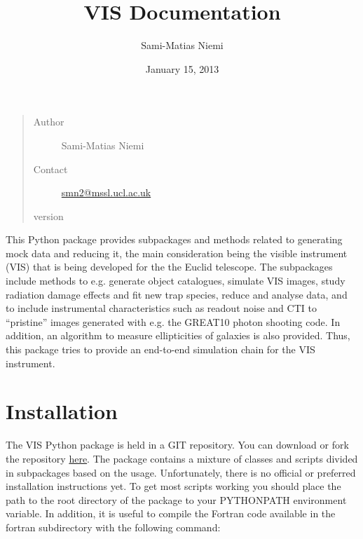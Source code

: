 \documentclass[a4paper,12pt,english]{sphinxmanual}
\title{VIS Documentation}
\date{January 15, 2013}
\author{Sami-Matias Niemi}
\begin{document}
\maketitle
\tableofcontents
{}\label{index::doc}

\begin{quote}\begin{description}
\item[{Author}] \leavevmode
Sami-Matias Niemi

\item[{Contact}] \leavevmode
\href{mailto:smn2@mssl.ucl.ac.uk}{smn2@mssl.ucl.ac.uk}

\item[{version}] 

\end{description}\end{quote}

This Python package provides subpackages and methods related to generating mock data and reducing it, the main
consideration being the visible instrument (VIS) that is being developed for the
the Euclid telescope. The subpackages include methods to e.g. generate object catalogues, simulate VIS images,
study radiation damage effects and fit new trap species, reduce and analyse data, and to include instrumental
characteristics such as readout noise and CTI to ``pristine'' images generated with e.g. the GREAT10 photon
shooting code. In addition, an algorithm to measure ellipticities of galaxies is also provided. Thus,
this package tries to provide an end-to-end simulation chain for the VIS instrument.


\chapter{Installation}
\label{index:installation}\label{index:welcome-to-euclid-visible-instrument-vis-python-package-documentation}
The VIS Python package is held in a GIT repository. You can download or fork the repository
\href{https://bitbucket.org/niemi/vissim-python/overview}{here}. The package contains a mixture of classes
and scripts divided in subpackages based on the usage. Unfortunately, there is no official or preferred
installation instructions yet. To get most scripts working you should place
the path to the root directory of the package to your PYTHONPATH environment variable. In addition, it is
useful to compile the Fortran code available in the fortran subdirectory with the following command:
\end{document}
